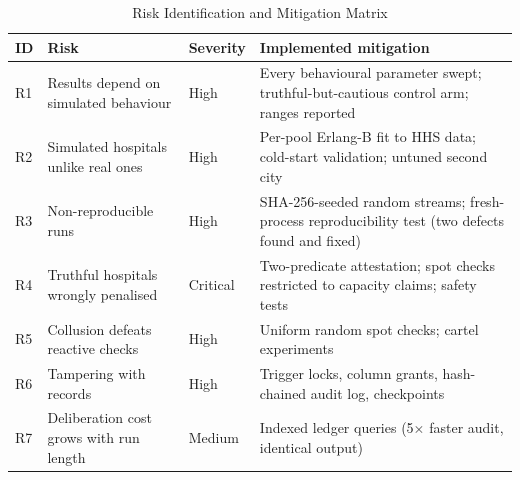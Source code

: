 \begin{table}[!t]
\centering
\caption{Risk Identification and Mitigation Matrix}
\label{tab:risks}
\scriptsize
\setlength{\tabcolsep}{2.5pt}
\begin{tabular}{@{}p{0.4cm}p{2.2cm}p{0.85cm}p{3.75cm}@{}}
\toprule
ID & Risk & Severity & Implemented mitigation \\
\midrule
R1 & Results depend on simulated behaviour & High & Every behavioural parameter swept; truthful-but-cautious control arm; ranges reported \\
R2 & Simulated hospitals unlike real ones & High & Per-pool Erlang-B fit to HHS data; cold-start validation; untuned second city \\
R3 & Non-reproducible runs & High & SHA-256-seeded random streams; fresh-process reproducibility test (two defects found and fixed) \\
R4 & Truthful hospitals wrongly penalised & Critical & Two-predicate attestation; spot checks restricted to capacity claims; safety tests \\
R5 & Collusion defeats reactive checks & High & Uniform random spot checks; cartel experiments \\
R6 & Tampering with records & High & Trigger locks, column grants, hash-chained audit log, checkpoints \\
R7 & Deliberation cost grows with run length & Medium & Indexed ledger queries (5$\times$ faster audit, identical output) \\
\bottomrule
\end{tabular}
\end{table}
